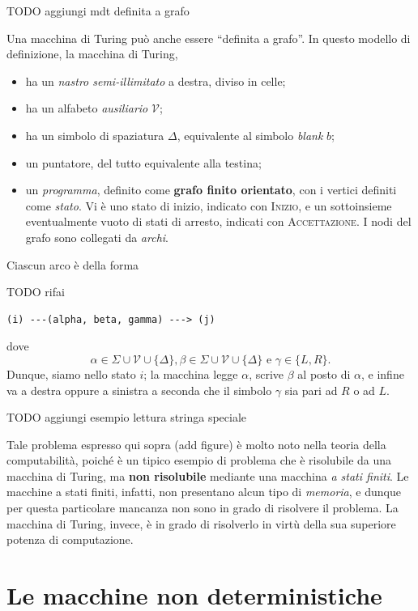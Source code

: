 \documentclass[10pt]{book}
\begin{document}
TODO aggiungi mdt definita a grafo

Una macchina di Turing può anche essere ``definita a grafo''. In questo modello
di definizione, la macchina di Turing,
\begin{itemize}
    \item ha un \emph{nastro semi-illimitato} a destra, diviso in celle;
    \item ha un alfabeto \emph{ausiliario} $\mathcal V$;
    \item ha un simbolo di spaziatura $\Delta$, equivalente al simbolo
        \emph{blank} $b$;
    \item un puntatore, del tutto equivalente alla testina;
    \item un \emph{programma}, definito come \textbf{grafo finito orientato},
        con i vertici definiti come \emph{stato}. Vi è uno stato di inizio,
        indicato con \textsc{Inizio}, e un sottoinsieme eventualmente vuoto di
        stati di arresto, indicati con \textsc{Accettazione}. I nodi del grafo
        sono collegati da \emph{archi}.
\end{itemize}

Ciascun arco è della forma

TODO rifai
\begin{verbatim}
(i) ---(alpha, beta, gamma) ---> (j)
\end{verbatim}

dove $$\alpha \in \Sigma \cup \mathcal V \cup \{\Delta\}, \beta \in \Sigma \cup
\mathcal V \cup \{\Delta\} \mbox{ e } \gamma \in \{L, R\}.$$ Dunque, siamo
nello stato $i$; la macchina legge $\alpha$, scrive $\beta$ al posto di
$\alpha$, e infine va a destra oppure a sinistra a seconda che il simbolo
$\gamma$ sia pari ad $R$ o ad $L$.

TODO aggiungi esempio lettura stringa speciale

Tale problema espresso qui sopra (add figure) è molto noto nella teoria della
computabilità, poiché è un tipico esempio di problema che è risolubile da una
macchina di Turing, ma \textbf{non risolubile} mediante una macchina \emph{a
stati finiti}. Le macchine a stati finiti, infatti, non presentano alcun tipo
di \emph{memoria}, e dunque per questa particolare mancanza non sono in grado
di risolvere il problema. La macchina di Turing, invece, è in grado di
risolverlo in virtù della sua superiore potenza di computazione.


\chapter{Le macchine non deterministiche}
\end{document}
